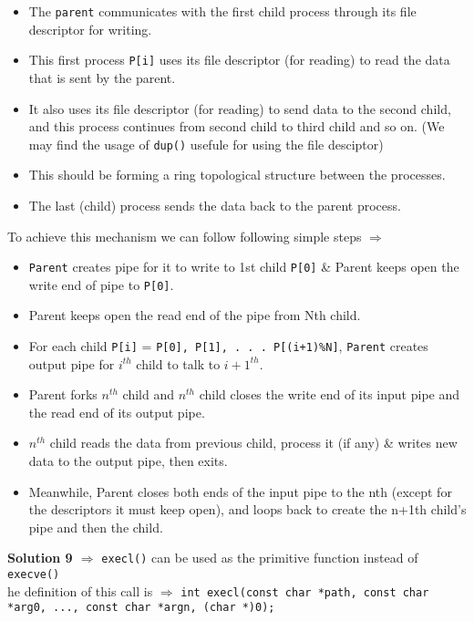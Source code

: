\documentclass[11pt]{article}
\newcommand\question[3]{{\textbf{Solution #1 $\Rightarrow$} #2} \vspace{.10in}\\}
\begin{document}
\begin{itemize}
  \item The \texttt{parent} communicates with the first child process through its file descriptor for writing.
  \item This first process \texttt{P[i]} uses its file descriptor (for reading) to read the data that is sent by the parent.
  \item It also uses its file descriptor (for reading) to send data to the second child, and this process continues from second child to third child and so on. (We may find the usage of \texttt{dup()} usefule for using the file desciptor)
  \item This should be forming a ring topological structure between the processes. 
  \item The last (child) process sends the data back to the parent process.
\end{itemize}   
To achieve this mechanism we can follow following simple steps $\Rightarrow$
\begin{itemize}
  \item \texttt{Parent} creates pipe for it to write to 1st child \texttt{P[0]} \& Parent keeps open the write end of pipe to \texttt{P[0]}.
  \item Parent keeps open the read end of the pipe from Nth child.
  \item For each child \texttt{P[i]} = \texttt{P[0], P[1], . . . P[(i+1)\%N]}, \texttt{Parent} creates output pipe for $i^{th}$ child to talk to $i+1^{th}$.
  \item Parent forks $n^{th}$ child and $n^{th}$ child closes the write end of its input pipe and the read end of its output pipe.
  \item $n^{th}$ child reads the data from previous child, process it (if any) \& writes new data to the output pipe, then exits.
  \item Meanwhile, Parent closes both ends of the input pipe to the nth (except for the descriptors it must keep open), and loops back to create the n+1th child's pipe and then the child.
\end{itemize}

\hrulefill

\question{9} {\texttt{execl()} can be used as the primitive function instead of \texttt{execve()}}

The definition of this call is $\Rightarrow$ \texttt{int execl(const char *path, const char *arg0, ..., const char *argn, (char *)0);}
\end{document}
